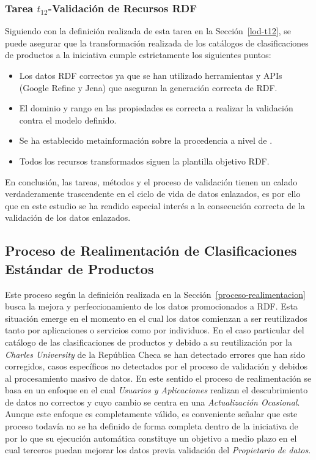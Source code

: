 \subsubsection{Tarea $t_{12}$-Validación de Recursos RDF}
Siguiendo con la definición realizada de esta tarea en la Sección~\ref{lod-t12}, se puede asegurar que la transformación 
realizada de los catálogos de clasificaciones de productos a la iniciativa \linkeddata cumple estrictamente los 
siguientes puntos:

\begin{itemize}
 \item Los datos \gls{RDF} correctos ya que se han utilizado herramientas y \gls{API}s (Google \gls{Refine} y Jena) que aseguran 
la generación correcta de RDF.
 \item El dominio y rango en las propiedades es correcta a realizar la validación contra el modelo definido.
 \item Se ha establecido metainformación sobre la procedencia a nivel de \dataset.
 \item Todos los recursos transformados siguen la plantilla objetivo RDF.
\end{itemize}

En conclusión, las tareas, métodos y el proceso de validación tienen un calado verdaderamente trascendente 
en el ciclo de vida de datos enlazados, es por ello que en este estudio se ha rendido especial interés 
a la consecución correcta de la validación de los datos enlazados.

\subsection{Proceso de Realimentación de Clasificaciones Estándar de Productos}
Este proceso según la definición realizada en la Sección~\ref{proceso-realimentacion} busca la mejora 
y perfeccionamiento de los datos promocionados a \gls{RDF}. Esta situación emerge en el momento en el cual 
los datos comienzan a ser reutilizados tanto por aplicaciones o servicios como por individuos. En el caso 
particular del catálogo de las clasificaciones de productos y debido a su reutilización por la 
\textit{Charles University} de la República Checa se han detectado errores que han sido 
corregidos, casos específicos no detectados por el proceso de validación y debidos al procesamiento masivo de datos. En este sentido el proceso 
de realimentación se basa en un enfoque en el cual \textit{Usuarios y Aplicaciones} realizan 
el descubrimiento de datos no correctos y cuyo cambio se centra en una \textit{Actualización Ocasional}. Aunque 
este enfoque es completamente válido, es conveniente señalar que este proceso todavía no se ha definido de forma 
completa dentro de la iniciativa de \linkeddata por lo que su ejecución automática constituye un objetivo 
a medio plazo en el cual terceros puedan mejorar los datos previa validación del \textit{Propietario de datos}.